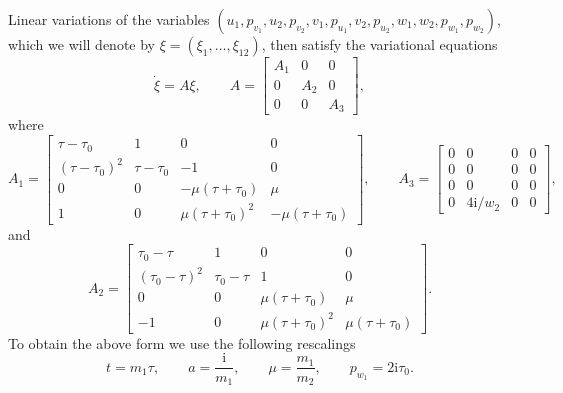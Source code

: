 \documentclass[pdftex]{sigma}
\numberwithin{equation}{section}
\begin{document}
Linear variations of the variables
$(u_1, p_{v_1},u_2,p_{v_2},v_1,p_{u_1},v_2,p_{u_2},w_1, w_2,
p_{w_1},p_{w_2})$, which we will denote by $\xi=(\xi_1, \ldots, \xi_{12})$, then
satisfy the variational equations
\begin{equation}
 \label{eq:varg}
 \dot \xi = A\xi, \qquad A = \begin{bmatrix}
 A_1 & 0 & 0\\
 0 & A_2 & 0\\
 0 & 0 & A_3
 \end{bmatrix}\!,
\end{equation}
where
\begin{equation*}
 A_1 = \begin{bmatrix}
 \tau -\tau_0& 1 & 0 & 0\\
 (\tau-\tau_0)^2 & \tau-\tau_0 & -1 & 0\\
 0 & 0 & -\mu(\tau+\tau_0) & \mu \\
 1 & 0 & \mu(\tau+\tau_0)^2 & -\mu(\tau+\tau_0)
 \end{bmatrix}\!,\qquad
 A_3 = \begin{bmatrix}
 0 & 0 & 0 & 0\\
 0 & 0 & 0 & 0\\
 0 & 0 & 0 & 0 \\
 0 & 4\mathrm{i}/w_2 & 0 & 0
 \end{bmatrix}\!,
\end{equation*}
and
\begin{equation*}
 A_2 = \begin{bmatrix}
 \tau_0-\tau & 1 & 0 & 0\\
 (\tau_0-\tau)^2 & \tau_0-\tau & 1 & 0\\
 0 & 0 & \mu(\tau+\tau_0) & \mu \\
 -1 & 0 & \mu(\tau+\tau_0)^2 & \mu(\tau+\tau_0)
 \end{bmatrix}\!.
\end{equation*}
To obtain the above form we use the following rescalings
\begin{equation*}
 t = m_1\tau,\qquad
 a = \frac{\mathrm{i}}{m_1},\qquad
 \mu = \frac{m_1}{m_2}, \qquad
 p_{w_1}=2 \mathrm{i} \tau_0.
\end{equation*}
\end{document}
